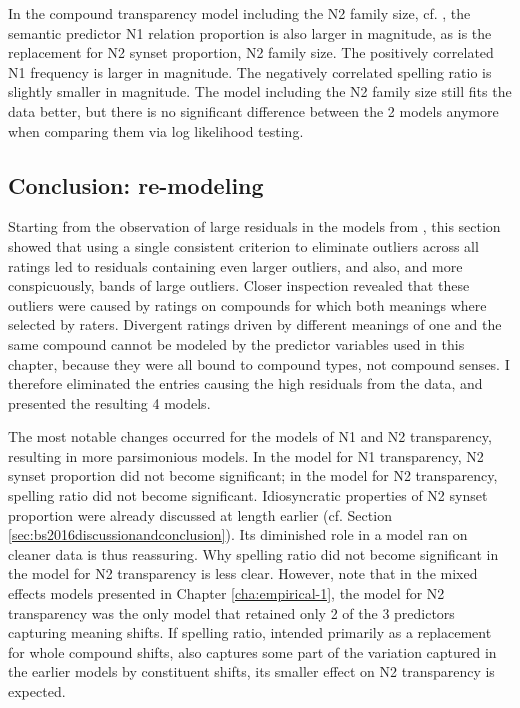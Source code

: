 In the compound transparency model including the N2 family size, cf. 
, the semantic predictor N1
relation proportion is also larger in magnitude, as is the replacement
for N2 synset proportion, N2 family size. The positively correlated N1
frequency is larger in magnitude. The negatively correlated spelling
ratio is slightly smaller in
magnitude. The model including the N2 family size still fits the data
better, but there is no significant difference between the 2
models anymore when comparing them via log likelihood testing.



\subsection{Conclusion: re-modeling \citet{BellandSchaefer:2016}}
\label{sec:con-remod-bs2016}

Starting from the observation of large residuals in the models from
\citet{BellandSchaefer:2016}, this section showed that using a single
consistent criterion to eliminate outliers across all ratings
led to residuals containing even larger outliers, and also, and more
conspicuously, bands of large outliers. Closer inspection revealed
that these outliers were caused by ratings on compounds for which
both meanings where selected by raters. Divergent ratings driven by different
meanings of one and the same compound cannot be modeled by the
predictor variables used in this chapter, because they were all bound
to compound types, not compound senses. I therefore eliminated the
entries causing the high residuals from the data, and presented the
resulting 4 models. %

The most notable changes occurred for the models of N1 and N2
transparency, resulting in more parsimonious models. In the model for
N1 transparency, N2 synset proportion did not become significant; in
the model for N2 transparency, spelling ratio did not become
significant. Idiosyncratic properties of N2 synset proportion were already discussed at length
earlier (cf. Section \ref{sec:bs2016discussionandconclusion}). Its
diminished role in a model ran on cleaner data is thus
reassuring. Why spelling ratio did not become significant in the model
for N2 transparency is less clear. However, note that in the mixed
effects models presented in Chapter \ref{cha:empirical-1}, the model
for N2 transparency was the only model that retained only 2 of the 3
predictors capturing meaning shifts. If spelling ratio, intended 
primarily as a replacement for whole compound shifts, also captures
some part of the variation captured in the earlier models by constituent shifts, its
smaller effect on N2 transparency is expected.

